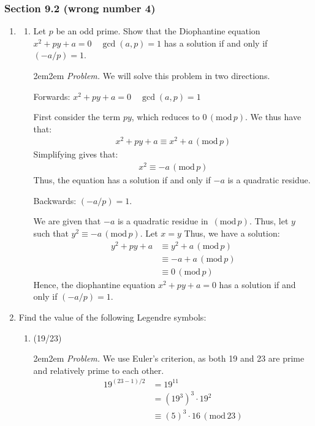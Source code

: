 \documentclass[10pt,oneside]{book}
\newcommand{\gspc}{\vspace{0.13cm}} %
\newcommand{\gmod}[1]{\,(\text{mod}\,#1)}
\newcommand{\centerit}[1]{{\begin{center} #1 \end{center}}}
\let\endoldproof\endproof
\newenvironment{problem}[1]
  {\vspace{-0.1cm}\begin{coloredadjust}\begin{adjustwidth}{2em}{2em}
   \textit{Problem. }#1}
  {\endoldproof
\end{adjustwidth}\end{coloredadjust}\gspc}
\begin{document}
\subsubsection*{Section 9.2 (wrong number 4)}
\begin{enumerate}
  \item [4.] \begin{enumerate}
    \item Let $p$ be an odd prime. Show that the Diophantine equation $x^2 + py + a = 0\quad \gcd(a,p) = 1$ has a solution if and only if $(-a/p)=1$.  
    \begin{problem}
      We will solve this problem in two directions.
      \centerit{Forwards: $x^2 + py + a = 0\quad \gcd(a,p)=1$}
      First consider the term $py$, which reduces to $0\gmod{p}$. We thus have that:
      \begin{align*}
        x^2 + py + a\equiv x^2 + a \gmod{p}
      \end{align*}
      Simplifying gives that:
      \begin{align*}
        x^2 \equiv -a \gmod{p}
      \end{align*}
      Thus, the equation has a solution if and only if $-a$ is a quadratic residue. 
      \centerit{Backwards: $(-a/p)=1$.}
      We are given that $-a$ is a quadratic residue in $\gmod p$. Thus, let $y$ such that $y^2\equiv -a\gmod{p}$. Let $x = y$ Thus, we have a solution:
      \begin{align*}
        y^2 + py + a &\equiv y^2 + a \gmod{p}\\
        &\equiv -a + a \gmod{p}\\
        &\equiv 0 \gmod{p}
      \end{align*}
      Hence, the diophantine equation $x^2 + py + a = 0$ has a solution if and only if $(-a/p)= 1$. 
    \end{problem}
  \end{enumerate}
  \item [1.] Find the value of the following Legendre symbols:
  \begin{enumerate}
    \item (19/23)
    \begin{problem}
      We use Euler's criterion, as both 19 and 23 are prime and relatively prime to each other.
      \begin{align*}
        19^{(23-1)/2}&=19^{11}\\
        &= (19^3)^3\cdot 19^2\\
        &\equiv (5)^3 \cdot 16\gmod{23}\\

\end{align*}
\end{problem}
\end{enumerate}
\end{enumerate}
\end{document}
